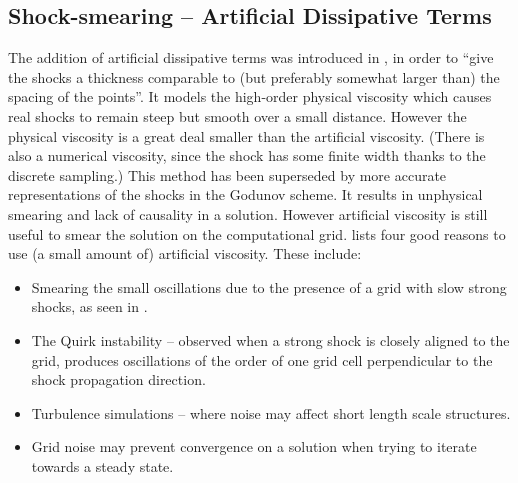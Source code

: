 \subsection{Shock-smearing -- Artificial Dissipative Terms}
The addition of artificial dissipative terms was introduced in \citet{vonNeumann:1950:MNC}, in
order to ``give the shocks a thickness comparable to (but preferably somewhat larger than) the spacing of the points''. 
It models the high-order physical viscosity which causes real shocks to remain steep but smooth over a small distance.
However the physical viscosity is a great deal smaller than the artificial viscosity. 
(There is also a numerical viscosity, since the shock has some finite width thanks to the discrete sampling.)
This method has been superseded by more accurate representations of the shocks in the Godunov scheme. 
It results in unphysical smearing and lack of causality in a solution.
However artificial viscosity is still useful to smear the solution on the computational grid. 
\citet{1998ApJS..116..133B} lists four good reasons to use (a small amount of) artificial viscosity.
These include:
\begin{itemize}
\item Smearing the small oscillations due to the presence of a grid with slow
strong shocks, as seen in \citet{1984jcp_colella_woodward}.
\item The Quirk instability -- observed when a strong shock is closely aligned to the grid, produces oscillations of the order of one grid cell perpendicular to the shock propagation direction.
\item Turbulence simulations -- where noise may affect short length scale structures.
\item Grid noise may prevent convergence on a solution when trying to iterate towards a steady state.
\end{itemize}




